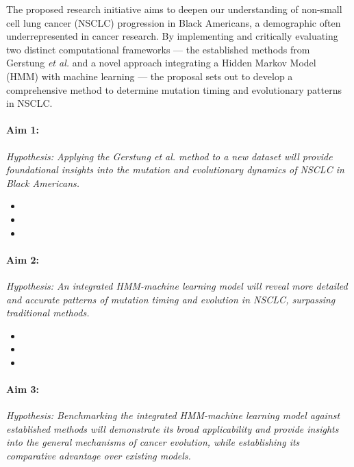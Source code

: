 The proposed research initiative aims to deepen our understanding of non-small cell lung cancer 
(NSCLC) progression in Black Americans, a demographic often underrepresented in cancer research. 
By implementing and critically evaluating two distinct computational frameworks — 
the established methods from Gerstung \textit{et al.} and a novel approach integrating a Hidden Markov Model (HMM) with machine learning — 
the proposal sets out to develop a comprehensive method to determine mutation timing and evolutionary patterns in NSCLC.

\paragraph*{Aim 1: \SpecificAimOne} 
\emph{Hypothesis: Applying the Gerstung \textit{et al.} method to a new dataset will provide foundational insights into the mutation and evolutionary dynamics of NSCLC in Black Americans.}

\begin{itemize}[noitemsep]
    \item \SpecificAimOneA
    \item \SpecificAimOneB
    \item \SpecificAimOneC
\end{itemize}

\paragraph*{Aim 2: \SpecificAimTwo} 
\emph{Hypothesis: An integrated HMM-machine learning model will reveal more detailed and accurate patterns of mutation timing and evolution in NSCLC, surpassing traditional methods.}

\begin{itemize}[noitemsep]
    \item \SpecificAimTwoA
    \item \SpecificAimTwoB
    \item \SpecificAimTwoC
\end{itemize}

\paragraph*{Aim 3: \SpecificAimThree} 
\emph{Hypothesis: Benchmarking the integrated HMM-machine learning model against established methods will demonstrate its broad applicability and provide insights into the general mechanisms of cancer evolution, while establishing its comparative advantage over existing models.}

